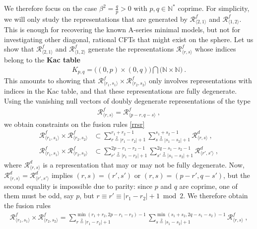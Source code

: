 \documentclass[12pt, a4paper]{article}
\theoremstyle{break}
\begin{document}
We therefore focus on the case $\beta^2 = \frac{q}{p}>0$ with $p,q\in\mathbb{N}^*$ coprime. For simplicity, we will only study the representations that are generated by $\mathcal{R}^f_{\langle 2,1\rangle}$ and $\mathcal{R}^f_{\langle 1,2\rangle}$. This is enough for recovering the known A-series minimal models, but not for investigating other diagonal, rational CFTs that might exist on the sphere. 
Let us show that $\mathcal{R}^f_{\langle 2,1\rangle}$ and $\mathcal{R}^f_{\langle 1,2\rangle}$ generate the representations $\mathcal{R}^f_{\langle r,s\rangle}$  whose indices belong to the \textbf{Kac table} 
\begin{align}
 \boxed{ K_{p, q}=  \big((0,p)\times (0,q)\big)\bigcap \big(\mathbb{N}\times \mathbb{N}\big) }\ .
 \label{kac}
\end{align}
This amounts to showing that $\mathcal{R}^f_{\langle r_1,s_1\rangle} \times \mathcal{R}^f_{\langle r_2,s_2\rangle}$ only involves representations with indices in the Kac table, and that these representations are fully degenerate. Using the vanishing null vectors of doubly degenerate representations of the type 
\begin{align}
 \mathcal{R}^f_{\langle r,s\rangle} = \mathcal{R}^f_{\langle p-r,q-s\rangle}\ , 
 \label{prqs}
\end{align}
we obtain constraints on the fusion rules \eqref{rrsr}
\begin{align}
 \mathcal{R}^f_{\langle r_1,s_1\rangle} \times \mathcal{R}^f_{\langle r_2,s_2\rangle} &\subset \sum_{r\overset{2}{=} |r_1-r_2|+1}^{r_1+r_2-1}\sum_{s\overset{2}{=} |s_1-s_2|+1}^{s_1+s_2-1} \mathcal{R}^d_{\langle r,s\rangle} \ , 
 \\
 \mathcal{R}^f_{\langle r_1,s_1\rangle} \times \mathcal{R}^f_{\langle r_2,s_2\rangle} &\subset \sum_{r'\overset{2}{=} |r_1-r_2|+1}^{2p-r_1-r_2-1} \sum_{s'\overset{2}{=} |s_1-s_2|+1}^{2q-s_1-s_2-1}\mathcal{R}^d_{\langle r',s'\rangle} \ , 
\end{align}
where $\mathcal{R}^d_{\langle r,s\rangle}$ is a representation that may or may not be fully degenerate. Now, $\mathcal{R}^d_{\langle r,s\rangle} = \mathcal{R}^d_{\langle r',s'\rangle}$ implies $(r,s)=(r',s')$ or $(r,s)=(p-r',q-s')$, but the second equality is impossible due to parity: since $p$ and $q$ are coprime, one of them must be odd, say $p$, but $r\equiv r'\equiv |r_1-r_2|+1\bmod 2$. We therefore obtain the fusion rules 
\begin{align}
 \boxed{\mathcal{R}^f_{\langle r_1,s_1\rangle} \times \mathcal{R}^f_{\langle r_2,s_2\rangle} = \sum_{r\overset{2}{=} |r_1-r_2|+1}^{\min(r_1+r_2,2p-r_1-r_2)-1}\sum_{s\overset{2}{=} |s_1-s_2|+1}^{\min(s_1+s_2,2q-s_1-s_2)-1} \mathcal{R}^f_{\langle r,s\rangle}} \ , 
 \label{rfrf}
\end{align}
\end{document}
